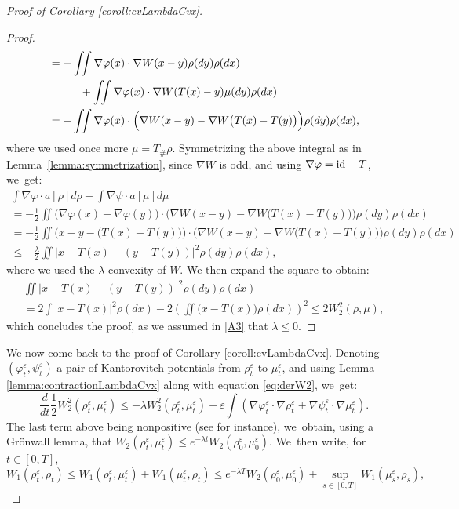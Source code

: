 \documentclass[JEP,XML,SOM,Unicode, NoFloatCountersInSection,published]{cedram}
\def\eps{\varepsilon}
\theoremstyle{plain}
\theoremstyle{definition}
\begin{document}
\begin{proof}[Proof of Corollary \ref{coroll:cvLambdaCvx}]
\begin{proof}
\begin{align*}
& = - \iint \nabla \varphi(x) \cdot \nabla W(x-y) \rho(dy) \rho(dx) \\
& \hspace*{1cm} + \iint \nabla \varphi(x) \cdot \nabla W(T(x)-y)\mu(dy)\rho(dx) \\
& = - \iint \nabla \varphi(x) \cdot \Big(\nabla W(x-y) - \nabla W\big(T(x)-T(y)\big)\Big) \rho(dy) \rho(dx),
\end{align*}
where we used once more $\mu = T_\# \rho$. Symmetrizing the above integral as in Lemma~\ref{lemma:symmetrization}, since $\nabla W$ is odd, and using $\nabla \varphi = \textup{id} - T$, we~get:
\begin{multline*}
\int \nabla \varphi \cdot a[\rho] d\rho + \int \nabla \psi \cdot a[\mu] d\mu \\
= - \frac 12 \iint \big(\nabla \varphi(x) - \nabla \varphi(y)\big) \cdot \Big(\nabla W(x-y) - \nabla W\big(T(x)-T(y)\big)\Big) \rho(dy) \rho(dx) \\
= - \frac 12 \iint \Big(x - y - \big(T(x) - T(y)\big)\Big) \cdot \Big(\nabla W(x-y) - \nabla W\big(T(x)-T(y)\big)\Big) \rho(dy) \rho(dx) \\
\leq - \frac{\lambda}{2} \iint |x - T(x) - (y - T(y))|^2 \rho(dy) \rho(dx),
\end{multline*}
where we used the $\lambda$-convexity of $W$.
We then expand the square to obtain:
\begin{multline*}
\iint |x - T(x) - (y - T(y))|^2 \rho(dy) \rho(dx) \\
= 2 \int |x - T(x)|^2 \rho(dx) - 2 \left(\iint \big(x - T(x)\big) \rho(dx)\right)^2 \leq 2 W_2^2(\rho, \mu),
\end{multline*}
which concludes the proof, as we assumed in \eqref{A3} that $\lambda \leq 0$.
\end{proof}
We now come back to the proof of Corollary \ref{coroll:cvLambdaCvx}. Denoting $(\varphi_t^\eps, \psi_t^\eps)$ a pair of Kantorovitch potentials from $\rho_t^\eps$ to $\mu_t^\eps$, and using Lemma \ref{lemma:contractionLambdaCvx} along with equation \eqref{eq:derW2}, we~get:
\[
\frac{d}{dt} \frac 12 W_2^2(\rho_t^\eps, \mu_t^\eps) \leq -\lambda W_2^2(\rho_t^\eps, \mu_t^\eps) - \eps \int (\nabla \varphi_t^\eps \cdot \nabla \rho_t^\eps + \nabla \psi_t^\eps \cdot \nabla \mu_t^\eps).
\]
The last term above being nonpositive (see \cite[Exer.\,66]{otam15} for instance), we~obtain, using a Grönwall lemma, that $W_2(\rho_t^\eps, \mu_t^\eps) \leq e^{-\lambda t} W_2(\rho_0^\eps, \mu_0^\eps)$. We~then write, for $t \in [0,T]$,
\[
W_1(\rho_t^\eps, \rho_t) \leq W_1(\rho_t^\eps, \mu_t^\eps) + W_1(\mu_t^\eps, \rho_t) \leq e^{-\lambda T} W_2(\rho_0^\eps, \mu_0^\eps) + \sup_{s \in [0,T]} W_1(\mu_s^\eps, \rho_s),
\]
\end{proof}
\end{document}
